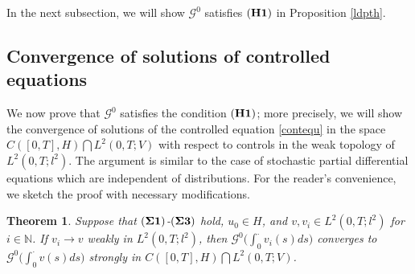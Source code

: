 \documentclass[11pt]{article}
\numberwithin{equation}{section}
\theoremstyle{plain}
\newtheorem{theorem}{Theorem}[section]
\begin{document}
 In the next subsection, we will
 show  $\mathcal{G}^0$
 satisfies $({\bf H1})$ in Proposition
 \ref{ldpth}.

 \subsection{Convergence of solutions of controlled equations}

 We now prove that    $\mathcal{G}^0$
 satisfies
 the condition  $({\bf H1})$; more precisely, we will show  the
 convergence of  solutions
 of the controlled equation
 \eqref{contequ}
 in the space
 $C([0,T], H) \bigcap L^2(0,T; V)$
 with respect to controls in the weak
 topology  of $L^2(0,T;l^2)$.
 The argument is similar to
 the case of stochastic
 partial differential equations
 which are independent of distributions.
 For the reader's convenience, we   sketch the proof with
 necessary
 modifications.


 \begin{theorem} \label{h1}
    Suppose that $({\bf \Sigma 1})$-$({\bf \Sigma 3})$ hold,
    $u_0 \in H$, and
    $v, v_i \in L^2(0, T; l^2)$ for $i \in \mathbb{N}$.
    If $v_i \rightarrow v$ weakly in $L^2(0, T; l^2)$,
    then
    $\mathcal{G}^0 \big( \int_0^\cdot v_i(s) ds \big)$
    converges to
    $\mathcal{G}^0 \big( \int_0^\cdot v(s) ds \big)$
    strongly
    in  $C([0,T], H) \bigcap L^2(0,T; V)$.
 \end{theorem}
\end{document}
